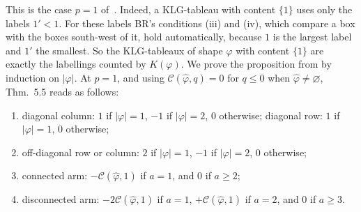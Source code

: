 \documentclass[11pt]{amsart}
\theoremstyle{definition}
\theoremstyle{remark}
\newcommand{\cC}{\mathcal{C}}
\begin{document}
This is the case $p=1$ of~\cite[Cor.~5.6]{BR12}. Indeed, a KLG-tableau with content $\{1\}$
uses only the labels $1'<1$. For these labels BR's conditions (iii) and (iv), which compare a
box with the boxes south-west of it, hold automatically, because $1$ is the largest label and
$1'$ the smallest. So the KLG-tableaux of shape $\varphi$ with content $\{1\}$ are exactly the
labellings counted by $K(\varphi)$. We prove the proposition from \cite[Thm.~5.5]{BR12} by
induction on $|\varphi|$. At $p=1$, and using $\cC(\hat\varphi,q)=0$ for $q\le0$ when
$\hat\varphi\ne\varnothing$, Thm.~5.5 reads as follows:
\begin{enumerate}[label=(\roman*)]
\item diagonal column: $1$ if $|\varphi|=1$, $-1$ if $|\varphi|=2$, $0$ otherwise; diagonal row:
$1$ if $|\varphi|=1$, $0$ otherwise;
\item off-diagonal row or column: $2$ if $|\varphi|=1$, $-1$ if $|\varphi|=2$, $0$ otherwise;
\item connected arm: $-\cC(\hat\varphi,1)$ if $a=1$, and $0$ if $a\ge2$;
\item disconnected arm: $-2\cC(\hat\varphi,1)$ if $a=1$, $+\cC(\hat\varphi,1)$ if $a=2$, and $0$ if $a\ge3$.
\end{enumerate}
\end{document}
